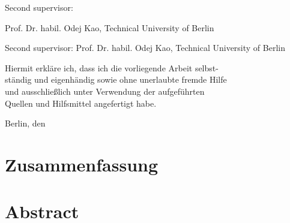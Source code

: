 \rule{0cm}{20cm}

\noindent Second supervisor: 

\noindent Prof. Dr. habil. Odej Kao, Technical University of Berlin

\noindent Second supervisor: 
\noindent Prof. Dr. habil. Odej Kao, Technical University of Berlin

\thispagestyle{empty}

\rule{0cm}{10cm}

\noindent Hiermit erkl\"are ich, dass ich die vorliegende Arbeit selbst-\\
st\"andig und eigenh\"andig sowie ohne unerlaubte fremde Hilfe \\
und ausschlie{\ss}lich unter Verwendung der aufgef\"uhrten \\
Quellen und Hilfsmittel angefertigt habe.
\vspace{1cm}

\noindent Berlin, den


\thispagestyle{empty}




\chapter*{Zusammenfassung}

\abstracttextde

\thispagestyle{empty}
\newpage
\vspace*{3cm}
\thispagestyle{empty}

\chapter*{Abstract}

\abstracttext

\thispagestyle{empty}
\newpage
\vspace*{3cm}
\thispagestyle{empty}



\setcounter{page}{8}
\tableofcontents

\newpage


\listoffigures
\listoflistings
\newpage
\thispagestyle{empty}
\newpage
\vspace*{3cm}
\thispagestyle{empty} \newpage
{}\setcounter{page}{1}